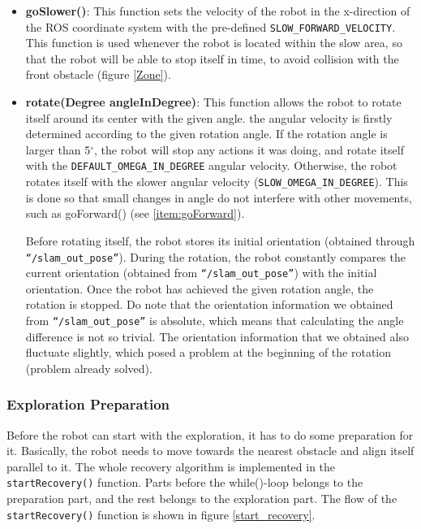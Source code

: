 \begin{itemize}
\item \textbf{goSlower()}: \label{item:goSlower}
This function sets the velocity of the robot in the x-direction of the ROS coordinate system with the pre-defined \texttt{SLOW\_FORWARD\_VELOCITY}. This function is used whenever the robot is located within the slow area, so that the robot will be able to stop itself in time, to avoid collision with the front obstacle (figure \ref{Zone}).


\item \textbf{rotate(Degree angleInDegree)}: \label{item:rotate}
This function allows the robot to rotate itself around its center with the given angle. the angular velocity is firstly determined according to the given rotation angle. If the rotation angle is larger than 5$^{\circ}$, the robot will stop any actions it was doing, and rotate itself with the \texttt{DEFAULT\_OMEGA\_IN\_DEGREE} angular velocity. Otherwise, the robot rotates itself with the slower angular velocity (\texttt{SLOW\_OMEGA\_IN\_DEGREE}). This is done so that small changes in angle do not interfere with other movements, such as goForward() (see \ref{item:goForward}). 

Before rotating itself, the robot stores its initial orientation (obtained through \\ \texttt{``/slam\_out\_pose''}). During the rotation, the robot constantly compares the current orientation (obtained from \texttt{``/slam\_out\_pose''}) with the initial orientation. Once the robot has achieved the given rotation angle, the rotation is stopped. Do note that the orientation information we obtained from \texttt{``/slam\_out\_pose''} is absolute, which means that calculating the angle difference is not so trivial. The orientation information that we obtained also fluctuate slightly, which posed a problem at the beginning of the rotation (problem already solved).
\end{itemize}

\subsubsection{Exploration Preparation} \label{subsection:implementation_preparation}

Before the robot can start with the exploration, it has to do some preparation for it. Basically, the robot needs to move towards the nearest obstacle and align itself parallel to it. The whole recovery algorithm is implemented in the \texttt{startRecovery()} function. Parts before the while()-loop belongs to the preparation part, and the rest belongs to the exploration part. The flow of the \texttt{startRecovery()} function is shown in figure \ref{start_recovery}.

